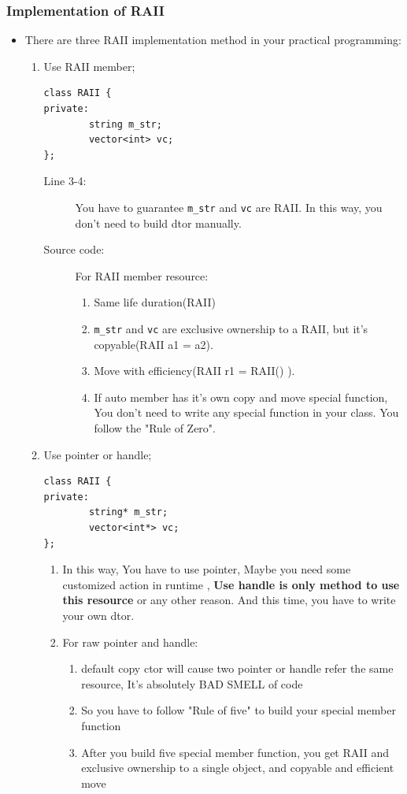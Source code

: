 \documentclass[a4paper,11pt,twoside]{book}
\begin{document}
\subsubsection{Implementation of RAII}

\begin{itemize}

	\item There are three RAII implementation method in your practical programming:
	\begin{enumerate}
		\item Use RAII member; 
\begin{lstlisting}[numbers=none]
class RAII {
private:
		string m_str;
		vector<int> vc;
};
\end{lstlisting}
			\begin{description}
				\item[Line 3-4:] You have to guarantee \texttt{m\_str} and \texttt{vc} are RAII.  In this way, you don't need to build dtor manually.
				
				\item[Source code:] For RAII member resource:
				\begin{enumerate}
					\item Same life duration(RAII)
					\item \texttt{m\_str} and \texttt{vc} are exclusive ownership to a RAII, but it's copyable(RAII a1 = a2).
					\item Move with efficiency(RAII r1 = RAII() ). 
					\item If auto member has it's own copy and move special function, You don't need to write any special function in your class. You follow the "Rule of Zero".
				\end{enumerate}
			\end{description}
		
		\item Use pointer or handle; 
\begin{lstlisting}[numbers=none]
class RAII {
private:
		string* m_str;
		vector<int*> vc;
};
\end{lstlisting}
			\begin{enumerate}
				\item In this way, You have to use pointer, Maybe you need some customized action in runtime , \textbf{Use handle is only method to use this resource} or any other reason. And this time, you have to write your own dtor.
				
				\item For raw pointer and handle: 
				\begin{enumerate}
					\item default copy ctor will cause two pointer or handle refer the same resource, It's absolutely BAD SMELL of code
					\item So you have to follow "Rule of five" to build your special member function
					\item After you build five special member function, you get RAII and exclusive ownership to a single object, and copyable and efficient move
				\end{enumerate}
			

\end{enumerate}
\end{enumerate}
\end{itemize}
\end{document}
